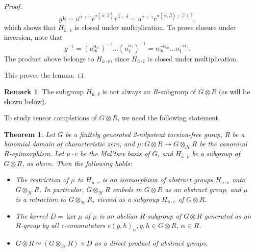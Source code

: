 \documentclass[11pt]{article}
\newtheorem{theorem}{Theorem}[section]
\theoremstyle{definition}
\newtheorem*{remark}{Remark}
\begin{document}
\begin{proof}
\begin{equation}\label{eq:H5}
gh =\bar u^{\bar \alpha +\bar \gamma} \bar v^{\sigma(\bar \alpha, \bar \beta)}\bar v^{\bar \beta +\bar \delta} =\bar u^{\bar \alpha +\bar \gamma} \bar v^{\sigma(\bar \alpha, \bar \beta) + \bar \beta +\bar \delta},
\end{equation}
which shows that $H_{\bar u \cdot \bar v}$ is closed under multiplication. To prove closure under inversion, note that
$$
g^{-1} = (u_m^{\alpha_m})^{-1}\ldots (u_1^{\alpha_1})^{-1} = u_m^{-\alpha_m} \ldots u_1^{-\alpha_1}.
$$
The product above belongs to $H_{\bar u \cdot \bar v}$, since $H_{\bar u \cdot \bar v}$ is closed under multiplication.

This proves the lemma.
\end{proof}

\begin{remark}
The subgroup $H_{\bar u \cdot \bar v}$ is not always an $R$-subgroup of $G \otimes R$ (as will be shown below).
\end{remark}

To study tensor completions of $G \otimes R$, we need the following statement.

\begin{theorem} \label{th:tensor-completions}
	Let $G$ be a finitely generated 2-nilpotent torsion-free group, $R$ be a binomial domain of characteristic zero, and $\mu:G \otimes R \to G \otimes_{\mathcal{H}} R$ be the canonical $R$-epimorphism. Let $\bar u \cdot \bar v$ be the Mal'tsev basis of $G$, and $H_{\bar u \cdot \bar v}$ be a subgroup of $G \otimes R$, as above. Then the following holds:
	\begin{itemize}
		\item [1)] The restriction of $\mu$ to $H_{\bar u \cdot \bar v}$ is an isomorphism of abstract groups $H_{\bar u \cdot \bar v}$ onto $G \otimes_{\mathcal{H}} R$. In particular, $G \otimes_{\mathcal{H}} R$ embeds in $G \otimes R$ as an abstract group, and $\mu$ is a retraction to $G \otimes_{\mathcal{H}} R$, viewed as a subgroup $H_{\bar u \cdot \bar v}$ of $G \otimes R$.
		\item [2)] The kernel $D = \ker \mu$ of $\mu$ is an abelian $R$-subgroup of $G \otimes R$ generated as an $R$-group by all c-commutators $c(g,h)_\alpha, g,h \in G \otimes R$, $\alpha \in R$.
		\item [3)] $G \otimes R \simeq (G \otimes_{\mathcal{H}} R) \times D$ as a direct product of abstract groups.
	\end{itemize}
\end{theorem}
\end{document}
